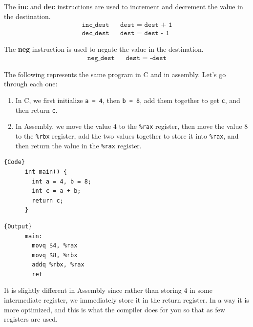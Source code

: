   \begin{definition}
    The \textbf{inc} and \textbf{dec} instructions are used to increment and decrement the value in the destination. 
    \begin{align*}
      \texttt{inc\_ dest} && \texttt{dest = dest + 1} \\
      \texttt{dec\_ dest} && \texttt{dest = dest - 1}
    \end{align*}
  \end{definition}

  \begin{definition}[Negative]
    The \textbf{neg} instruction is used to negate the value in the destination. 
    \begin{align*}
      \texttt{neg\_ dest} && \texttt{dest = -dest} 
    \end{align*}
  \end{definition}

  \begin{example}
    The following represents the same program in C and in assembly. Let's go through each one: 
    \begin{enumerate}
      \item In C, we first initialize \texttt{a = 4}, then \texttt{b = 8}, add them together to get \texttt{c}, and then return \texttt{c}.
      \item In Assembly, we move the value $4$ to the \texttt{\%rax} register, then move the value $8$ to the \texttt{\%rbx} register, add the two values together to store it into \texttt{\%rax}, and then return the value in the \texttt{\%rax} register.
    \end{enumerate}
    \noindent\begin{minipage}{.5\textwidth}
    \begin{lstlisting}[]{Code}
      int main() {
        int a = 4, b = 8; 
        int c = a + b; 
        return c; 
      }
    \end{lstlisting}
    \end{minipage}
    \hfill
    \begin{minipage}{.49\textwidth}
    \begin{lstlisting}[]{Output}
      main:
        movq $4, %rax
        movq $8, %rbx
        addq %rbx, %rax
        ret
    \end{lstlisting}
    \end{minipage}
    It is slightly different in Assembly since rather than storing $4$ in some intermediate register, we immediately store it in the return register. In a way it is more optimized, and this is what the compiler does for you so that as few registers are used. 
  \end{example}

